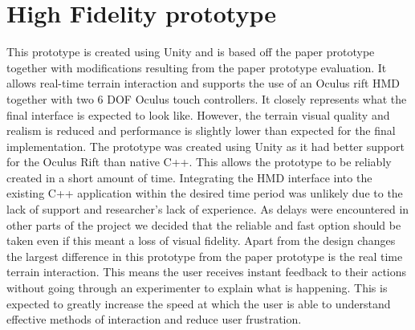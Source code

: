 \documentclass{article}
\begin{document}
\section{High Fidelity prototype}

This prototype is created using Unity and is based off the paper prototype together with modifications resulting from the paper prototype evaluation. It allows real-time terrain interaction and supports the use of an Oculus rift HMD together with two  6 DOF Oculus touch controllers. It closely represents what the final interface is expected to look like. However, the terrain visual quality and realism is reduced and performance is slightly lower than expected for the final implementation.
\newline\newline
The prototype was created using Unity as it had better support for the Oculus Rift than native C++. This allows the prototype to be reliably created in a short amount of time. Integrating the HMD interface into the existing C++ application within the desired time period was unlikely due to the lack of support and researcher's lack of experience. As delays were encountered in other parts of the project we decided that the reliable and fast option should be taken even if this meant a loss of visual fidelity.
\newline\newline
Apart from the design changes the largest difference in this prototype from the paper prototype is the real time terrain interaction. This means the user receives instant feedback to their actions without going through an experimenter to explain what is happening. This is expected to greatly increase the speed at which the user is able to understand effective methods of interaction and reduce user frustration.
\end{document}

